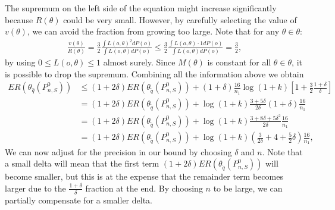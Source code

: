 \documentclass[11pt, a4paper]{article}
\theoremstyle{definition}
\theoremstyle{remark}
\newcommand{\q}{q}
\newcommand{\btheta}{\theta}
\begin{document}
The supremum on the left side of the equation might increase significantly because $R(\btheta)$ could be very small. However, by carefully selecting the value of $v(\btheta)$, we can avoid the fraction from growing too large. Note that for any $ \btheta \in \btheta $:
\begin{align*}
    \frac{v(\btheta)}{R(\btheta)} = \frac{3}{2} \frac{\int L(o, \btheta)^2 d P(o)}{\int L(o, \btheta) dP(o)  } \leq \frac{3}{2} \frac{\int L(o, \btheta) \cdot 1 dP(o) }{\int L(o, \btheta) dP(o) } = \frac{3}{2},
\end{align*}
by using $ 0 \leq L(o, \btheta) \leq 1 $ almost surely. Since $ M(\btheta) $ is constant for all $ \btheta \in \btheta $, it is possible to drop the supremum. Combining all the information above we obtain 
\begin{align*}
   ER(\btheta_{\hat{\q}}(P_{n, S}^{0})) &\leq(1 + 2 \delta) ER(\btheta_{ \tilde{\q}}(P_{n,S}^{0})) +(1 + \delta) \frac{16}{n_1} \log (1 +k) \left[ 1 + \frac{3}{2} \frac{1 + \delta}{\delta}\right]\\
                                        &= (1 + 2 \delta) ER(\btheta_{ \tilde{\q}}(P_{n,S}^{0})) +\log (1 +k) \frac{3 + 5\delta}{2\delta}(1 + \delta) \frac{16}{n_1} \\
                                        &= (1 + 2 \delta) ER(\btheta_{ \tilde{\q}}(P_{n,S}^{0})) +\log (1 +k) \frac{3 + 8\delta + 5 \delta^2}{2\delta}\frac{16}{n_1} \\\
                                        &= (1 + 2 \delta) ER(\btheta_{ \tilde{\q}}(P_{n,S}^{0})) +\log (1 +k) \left( \frac{3}{2\delta} + 4 + \frac{5}{2} \delta \right) \frac{16}{n_1},
\end{align*}
We can now adjust for the precision in our bound by choosing $ \delta $ and $ n $. Note that a small delta will mean that the first term $ (1 + 2 \delta) E R(\btheta_{ \tilde{q} }(P_{n, S}^{0})) $ will become smaller, but this is at the expense that the remainder term becomes larger due to the $ \frac{1 + \delta}{ \delta} $ fraction at the end. By choosing $ n $ to be large, we can partially compensate for a smaller delta.
\end{document}
